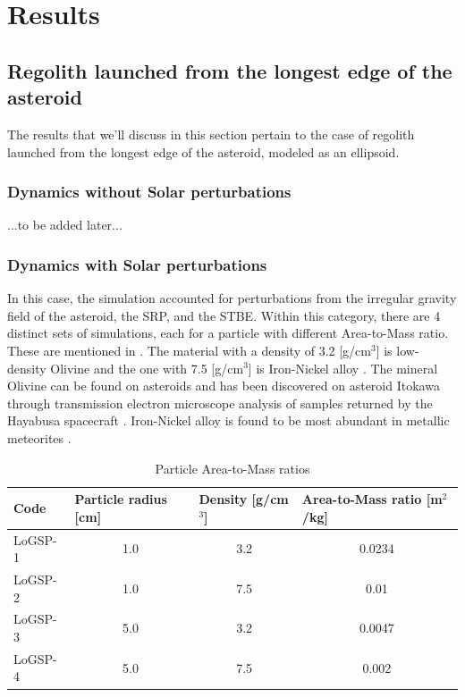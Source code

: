\chapter{Results}
\label{results}
\graphicspath{{Results/Images/}}

\section{Regolith launched from the longest edge of the asteroid}
\label{regolith_longest_edge}
The results that we'll discuss in this section pertain to the case of regolith launched from the longest edge of the asteroid, modeled as an ellipsoid.

\subsection{Dynamics without Solar perturbations}
\label{regolith_longest_edge_without_solar}
...to be added later...

\subsection{Dynamics with Solar perturbations}
\label{regolith_longest_edge_with_solar}
In this case, the simulation accounted for perturbations from the irregular gravity field of the asteroid, the \gls{SRP}, and the \gls{STBE}. Within this category, there are 4 distinct sets of simulations, each for a particle with different Area-to-Mass ratio. These are mentioned in . The material with a density of 3.2 [g/cm$^3$] is low-density Olivine and the one with 7.5 [g/cm$^3$] is Iron-Nickel alloy \cite{passiveSorting}. The mineral Olivine can be found on asteroids and has been discovered on asteroid Itokawa through transmission electron microscope analysis of samples returned by the Hayabusa spacecraft \cite{olivineHayabusa}. Iron-Nickel alloy is found to be most abundant in metallic meteorites \cite{ironAlloy}.
\begin{table}[]
\centering
\captionsetup{justification=centering}
\caption{Particle Area-to-Mass ratios}
\label{tab:area_to_mass_ratio}
\begin{tabular}{|l|c|c|c|}
\hline
Code    & \multicolumn{1}{l|}{Particle radius {[}cm{]}} & \multicolumn{1}{l|}{Density {[}g/cm$^3${]}} & \multicolumn{1}{l|}{Area-to-Mass ratio {[}m$^2$/kg{]}} \\ \hline
LoGSP-1     &   1.0     &   3.2     &   0.0234      \\ \hline
LoGSP-2     &   1.0     &   7.5     &   0.01        \\ \hline
LoGSP-3     &   5.0     &   3.2     &   0.0047      \\ \hline
LoGSP-4     &   5.0     &   7.5     &   0.002       \\ \hline
\end{tabular}
\end{table}

